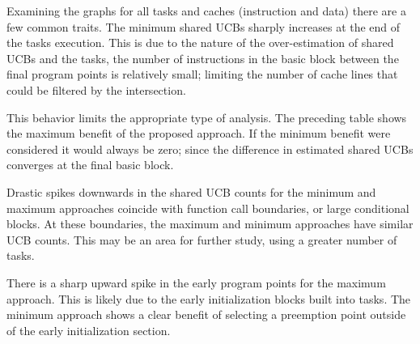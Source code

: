 %
%
%
%
%
%
%
%
%
%
Examining the graphs for all tasks and caches (instruction and data)
there are a few common traits. The minimum shared UCBs sharply
increases at the end of the tasks execution. This is due to the nature
of the over-estimation of shared UCBs and the tasks, the number of
instructions in the basic block between the final program points is
relatively small; limiting the number of cache lines that could be
filtered by the intersection.

This behavior limits the appropriate type of analysis. The preceding
table shows the maximum benefit of the proposed approach. If the
minimum benefit were considered it would always be zero; since the
difference in estimated shared UCBs converges at the final basic
block.

Drastic spikes downwards in the shared UCB counts for the minimum and
maximum approaches coincide with function call boundaries, or large
conditional blocks. At these boundaries, the maximum and minimum
approaches have similar UCB counts. This may be an area for further
study, using a greater number of tasks.

There is a sharp upward spike in the early program points for the
maximum approach. This is likely due to the early initialization
blocks built into tasks. The minimum approach shows a clear benefit of
selecting a preemption point outside of the early initialization
section.
